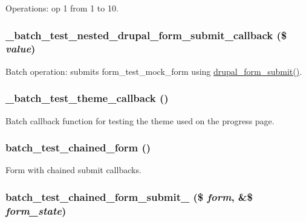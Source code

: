 Operations: op 1 from 1 to 10. \hypertarget{batch__test_8module_ad87bcf9d5c91f742ead185492a0fc2d3}{
\subsubsection[{\_\-batch\_\-test\_\-nested\_\-drupal\_\-form\_\-submit\_\-callback}]{\setlength{\rightskip}{0pt plus 5cm}\_\-batch\_\-test\_\-nested\_\-drupal\_\-form\_\-submit\_\-callback (\$ {\em value})}}
\label{batch__test_8module_ad87bcf9d5c91f742ead185492a0fc2d3}
Batch operation: submits form\_\-test\_\-mock\_\-form using \hyperlink{group__form__api_ga4312d7fe0602f6359153fc62cba1ca24}{drupal\_\-form\_\-submit()}. \hypertarget{batch__test_8module_aac27af611539934c863ce75be5d0b0e3}{
\subsubsection[{\_\-batch\_\-test\_\-theme\_\-callback}]{\setlength{\rightskip}{0pt plus 5cm}\_\-batch\_\-test\_\-theme\_\-callback ()}}
\label{batch__test_8module_aac27af611539934c863ce75be5d0b0e3}
Batch callback function for testing the theme used on the progress page. \hypertarget{batch__test_8module_afcbe5152f11e210c96de10123a41f518}{
\subsubsection[{batch\_\-test\_\-chained\_\-form}]{\setlength{\rightskip}{0pt plus 5cm}batch\_\-test\_\-chained\_\-form ()}}
\label{batch__test_8module_afcbe5152f11e210c96de10123a41f518}
Form with chained submit callbacks. \hypertarget{batch__test_8module_a2f5996696bbb4db0285667a7e9d12f41}{
\subsubsection[{batch\_\-test\_\-chained\_\-form\_\-submit\_\-1}]{\setlength{\rightskip}{0pt plus 5cm}batch\_\-test\_\-chained\_\-form\_\-submit\_ (\$ {\em form}, \/  \&\$ {\em form\_\-state})}}
